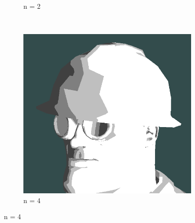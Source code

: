 \begin{figure}[h]
\begin{subfigure}[b]{0.15\textwidth}
        \caption{n = 2}
        \label{fig:cel-shading-n2}
    \end{subfigure}
    ~
    \begin{subfigure}[b]{0.15\textwidth}
        \includegraphics[width=\textwidth]{img/cel-shading-n4.png}
        \caption{n = 4}
        \label{fig:cel-shading-n4}
    \end{subfigure}


\end{figure}

